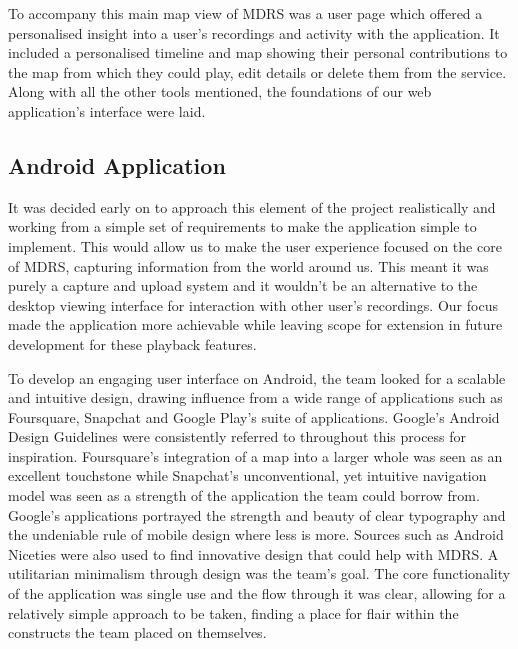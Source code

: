\documentclass{l3proj}
\begin{document}
To accompany this main map view of MDRS was a user page which offered a
personalised insight into a user's recordings and activity with the application.
It included a personalised timeline and map showing their personal contributions
to the map from which they could play, edit details or delete them from the
service. Along with all the other tools mentioned, the foundations of our
web application's interface were laid.

\subsection{Android Application} It was decided early on to approach this
element of the project realistically and working from a simple set of requirements to
make the application simple to implement. This would allow us to make the user experience focused on the core of MDRS, capturing information from the world around us. This meant it was purely a capture and upload system and it wouldn't be an alternative to the desktop viewing interface for interaction with other user's recordings. Our focus made the application more achievable while leaving scope for extension in future development for these playback features.

To develop an engaging user interface on Android, the team looked for a scalable and intuitive design, drawing influence from a wide range of applications such as Foursquare, Snapchat and Google Play’s suite of applications. Google's Android Design Guidelines were consistently referred to throughout this process for inspiration.  Foursquare's integration of a map into a larger whole was seen as an excellent touchstone while Snapchat's unconventional, yet intuitive navigation model was seen as a strength of the application the team could borrow from. Google's applications portrayed the strength and beauty of clear typography and the undeniable rule of mobile design where less is more. Sources such as Android Niceties were also used to find innovative design that could help with MDRS. A utilitarian minimalism through design was the team's goal. The core functionality of the application was single use and the flow through it was clear, allowing for a relatively simple approach to be taken, finding a place for flair within the constructs the team placed on themselves.
\end{document}
